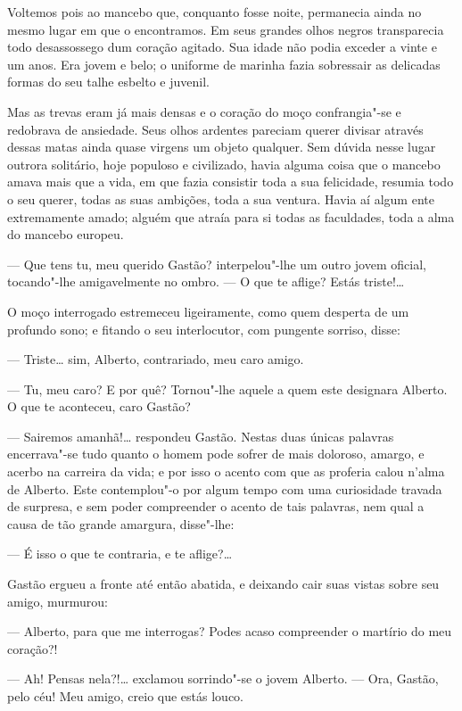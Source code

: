 Voltemos pois ao mancebo que, conquanto fosse noite, permanecia ainda no
mesmo lugar em que o encontramos. Em seus grandes olhos negros
transparecia todo desassossego dum coração agitado. Sua idade não podia
exceder a vinte e um anos. Era jovem e belo; o uniforme de marinha fazia
sobressair as delicadas formas do seu talhe esbelto e juvenil.

Mas as trevas eram já mais densas e o coração do moço confrangia"-se e
redobrava de ansiedade. Seus olhos ardentes pareciam querer divisar
através dessas matas ainda quase virgens um objeto qualquer. Sem dúvida
nesse lugar outrora solitário, hoje populoso e civilizado, havia alguma
coisa que o mancebo amava mais que a vida, em que fazia consistir toda a
sua felicidade, resumia todo o seu querer, todas as suas ambições, toda
a sua ventura. Havia aí algum ente extremamente amado; alguém que atraía
para si todas as faculdades, toda a alma do mancebo europeu.

--- Que tens tu, meu querido Gastão? interpelou"-lhe um outro jovem
oficial, tocando"-lhe amigavelmente no ombro. --- O que te aflige? Estás
triste!\ldots{}

O moço interrogado estremeceu ligeiramente, como quem desperta de um
profundo sono; e fitando o seu interlocutor, com pungente sorriso,
disse:

--- Triste\ldots{} sim, Alberto, contrariado, meu caro amigo.

--- Tu, meu caro? E por quê? Tornou"-lhe aquele a quem este designara
Alberto. O que te aconteceu, caro Gastão?

--- Sairemos amanhã!\ldots{} respondeu Gastão. Nestas duas únicas palavras
encerrava"-se tudo quanto o homem pode sofrer de mais doloroso, amargo, e
acerbo na carreira da vida; e por isso o acento com que as proferia
calou n'alma de Alberto. Este contemplou"-o por algum tempo com uma
curiosidade travada de surpresa, e sem poder compreender o acento de
tais palavras, nem qual a causa de tão grande amargura, disse"-lhe:

--- É isso o que te contraria, e te aflige?\ldots{}

Gastão ergueu a fronte até então abatida, e deixando cair suas vistas
sobre seu amigo, murmurou:

--- Alberto, para que me interrogas? Podes acaso compreender o martírio
do meu coração?!

--- Ah! Pensas nela?!\ldots{} exclamou sorrindo"-se o jovem Alberto. --- Ora,
Gastão, pelo céu! Meu amigo, creio que estás louco.

